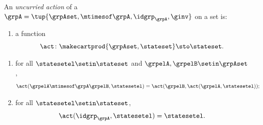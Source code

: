 \begin{ctdefinition}
    \label{def:group-uncurried-action}

    An \emph{uncurried action} of a  $\grpA = \tup{\grpAset, \mtimesof\grpA, \idgrp_\grpA, \ginv}$ on a set \stateset is:

    \constit
    \begin{enumerate}
        \item a function
              \begin{equation}
                  \label{eq:group-uncurried-action}
                  \act \colon \makecartprod{\grpAset, \stateset} \sto \stateset.
              \end{equation}
    \end{enumerate}
    \condit
    \begin{enumerate}
        \item for all $\statesetel \setin \stateset$ and $\grpelA,\grpelB\setin\grpAset$,
              \begin{equation}
                  \label{eq:group-uncurried-action-1cond}
                  \act(\grpelA \mtimesof\grpA \grpelB, \statesetel) = \act(\grpelB, \act(\grpelA, \statesetel));
              \end{equation}
        \item for all $\statesetel \setin \stateset$,
              \begin{equation}
                  \label{eq:group-uncurried-action-2cond}
                  \act(\idgrp_\grpA, \statesetel) = \statesetel.
              \end{equation}
    \end{enumerate}
\end{ctdefinition}





